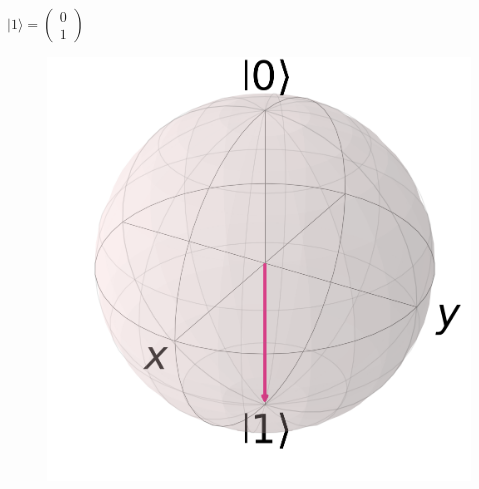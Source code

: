 \documentclass{beamer}
\newcommand{\ket}[1]{\lvert#1\rangle} %
\begin{document}
\begin{frame}
\begin{columns}[c]
		\begin{column}{.3\textwidth}
			\centering
			$\ket{1} = \begin{pmatrix}
			0\\
			1
			\end{pmatrix}$
			\begin{figure}
				\centering
				\includegraphics[width=1\textwidth]{qubit1.png}            
			\end{figure}
		\end{column}
						
		
	\end{columns}
			    
\end{frame}
\end{document}
